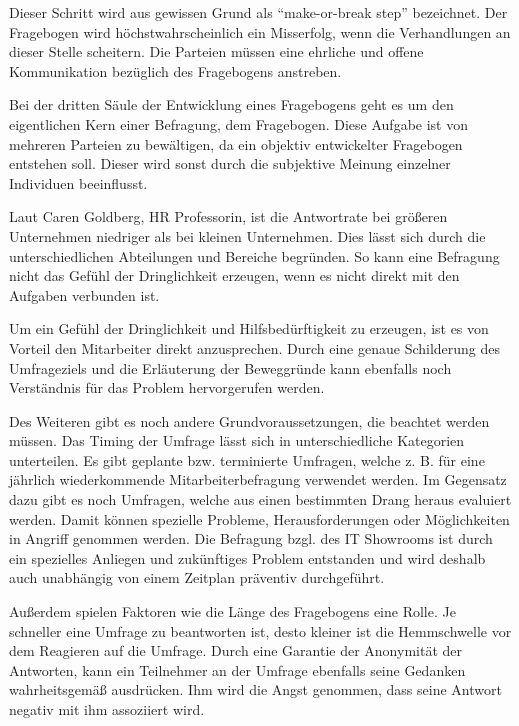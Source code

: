 Dieser Schritt wird aus gewissen Grund als \enquote{make-or-break step} bezeichnet. 
Der Fragebogen wird höchstwahrscheinlich ein Misserfolg, wenn die Verhandlungen an dieser Stelle scheitern.
Die Parteien müssen eine ehrliche und offene Kommunikation bezüglich des Fragebogens anstreben.

Bei der dritten Säule der Entwicklung eines Fragebogens geht es um den eigentlichen Kern einer Befragung, dem Fragebogen.
Diese Aufgabe ist von mehreren Parteien zu bewältigen, da ein objektiv entwickelter Fragebogen entstehen soll.
Dieser wird sonst durch die subjektive Meinung einzelner Individuen beeinflusst\autocite[S.21]{2009Fragebogen}.

Laut Caren Goldberg, HR Professorin, ist die Antwortrate bei größeren Unternehmen niedriger als bei kleinen Unternehmen.
Dies lässt sich durch die unterschiedlichen Abteilungen und Bereiche begründen.
So kann eine Befragung nicht das Gefühl der Dringlichkeit erzeugen, wenn es nicht direkt mit den Aufgaben verbunden ist. 

Um ein Gefühl der Dringlichkeit und Hilfsbedürftigkeit zu erzeugen, ist es von Vorteil den Mitarbeiter direkt anzusprechen.
Durch eine genaue Schilderung des Umfrageziels und die Erläuterung der Beweggründe kann ebenfalls noch Verständnis für das Problem hervorgerufen werden.

Des Weiteren gibt es noch andere Grundvoraussetzungen, die beachtet werden müssen.
Das Timing der Umfrage lässt sich in unterschiedliche Kategorien unterteilen.
Es gibt geplante bzw. terminierte Umfragen, welche z. B. für eine jährlich wiederkommende Mitarbeiterbefragung verwendet werden.
Im Gegensatz dazu gibt es noch Umfragen, welche aus einen bestimmten Drang heraus evaluiert werden.
Damit können spezielle Probleme, Herausforderungen oder Möglichkeiten in Angriff genommen werden.
Die Befragung bzgl. des IT Showrooms ist durch ein spezielles Anliegen und zukünftiges Problem entstanden und wird deshalb auch unabhängig von einem Zeitplan präventiv durchgeführt\autocite[Timing is Everything]{Perfect}.

Außerdem spielen Faktoren wie die Länge des Fragebogens eine Rolle. Je schneller eine Umfrage zu beantworten ist, desto kleiner ist die Hemmschwelle vor dem Reagieren auf die Umfrage.
Durch eine Garantie der Anonymität der Antworten, kann ein Teilnehmer an der Umfrage ebenfalls seine Gedanken wahrheitsgemäß ausdrücken.
Ihm wird die Angst genommen, dass seine Antwort negativ mit ihm assoziiert wird\autocite[Chapter 4
Putting It Together]{Perfect}.

